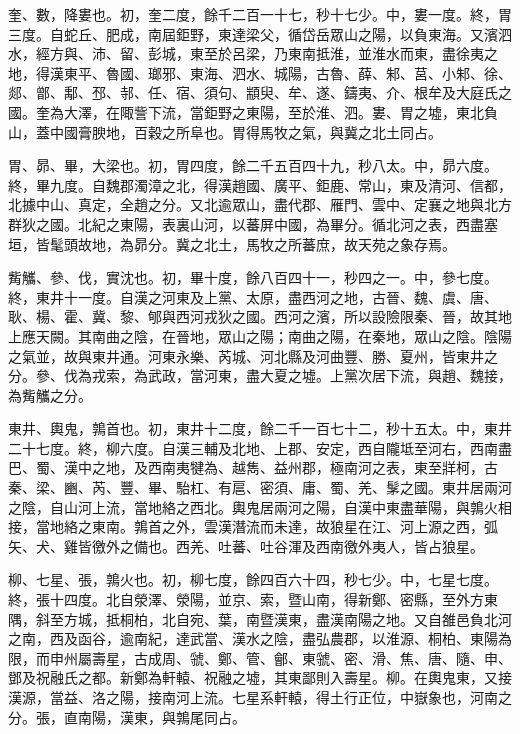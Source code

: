 \begin{pinyinscope}
 奎、數，降婁也。初，奎二度，餘千二百一十七，秒十七少。中，婁一度。終，胃三度。自蛇丘、肥成，南屆鉅野，東達梁父，循岱岳眾山之陽，以負東海。又濱泗水，經方與、沛、留、彭城，東至於呂梁，乃東南抵淮，並淮水而東，盡徐夷之地，得漢東平、魯國、瑯邪、東海、泗水、城陽，古魯、薛、邾、莒、小邾、徐、郯、鄫、鄅、邳、邿、任、宿、須句、顓臾、牟、遂、鑄夷、介、根牟及大庭氏之國。奎為大澤，在陬訾下流，當鉅野之東陽，至於淮、泗。婁、胃之墟，東北負山，蓋中國膏腴地，百穀之所阜也。胃得馬牧之氣，與冀之北土同占。



 胃、昴、畢，大梁也。初，胃四度，餘二千五百四十九，秒八太。中，昴六度。終，畢九度。自魏郡濁漳之北，得漢趙國、廣平、鉅鹿、常山，東及清河、信都，北據中山、真定，全趙之分。又北逾眾山，盡代郡、雁門、雲中、定襄之地與北方群狄之國。北紀之東陽，表裏山河，以蕃屏中國，為畢分。循北河之表，西盡塞垣，皆髦頭故地，為昴分。冀之北土，馬牧之所蕃庶，故天苑之象存焉。



 觜觿、參、伐，實沈也。初，畢十度，餘八百四十一，秒四之一。中，參七度。終，東井十一度。自漢之河東及上黨、太原，盡西河之地，古晉、魏、虞、唐、耿、楊、霍、冀、黎、郇與西河戎狄之國。西河之濱，所以設險限秦、晉，故其地上應天闕。其南曲之陰，在晉地，眾山之陽；南曲之陽，在秦地，眾山之陰。陰陽之氣並，故與東井通。河東永樂、芮城、河北縣及河曲豐、勝、夏州，皆東井之分。參、伐為戎索，為武政，當河東，盡大夏之墟。上黨次居下流，與趙、魏接，為觜觿之分。



 東井、輿鬼，鶉首也。初，東井十二度，餘二千一百七十二，秒十五太。中，東井二十七度。終，柳六度。自漢三輔及北地、上郡、安定，西自隴坻至河右，西南盡巴、蜀、漢中之地，及西南夷犍為、越雋、益州郡，極南河之表，東至牂柯，古秦、梁、豳、芮、豐、畢、駘杠、有扈、密須、庸、蜀、羌、髳之國。東井居兩河之陰，自山河上流，當地絡之西北。輿鬼居兩河之陽，自漢中東盡華陽，與鶉火相接，當地絡之東南。鶉首之外，雲漢潛流而未達，故狼星在江、河上源之西，弧矢、犬、雞皆徼外之備也。西羌、吐蕃、吐谷渾及西南徼外夷人，皆占狼星。



 柳、七星、張，鶉火也。初，柳七度，餘四百六十四，秒七少。中，七星七度。終，張十四度。北自滎澤、滎陽，並京、索，暨山南，得新鄭、密縣，至外方東隅，斜至方城，抵桐柏，北自宛、葉，南暨漢東，盡漢南陽之地。又自雒邑負北河之南，西及函谷，逾南紀，達武當、漢水之陰，盡弘農郡，以淮源、桐柏、東陽為限，而申州屬壽星，古成周、虢、鄭、管、鄶、東虢、密、滑、焦、唐、隨、申、鄧及祝融氏之都。新鄭為軒轅、祝融之墟，其東鄙則入壽星。柳。在輿鬼東，又接漢源，當益、洛之陽，接南河上流。七星系軒轅，得土行正位，中嶽象也，河南之分。張，直南陽，漢東，與鶉尾同占。




\end{pinyinscope}
